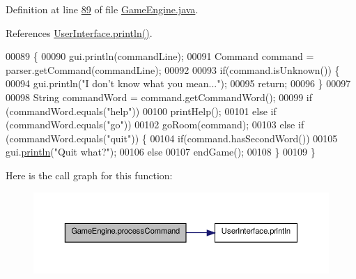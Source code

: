 Definition at line \hyperlink{GameEngine_8java_source_l00089}{89} of file \hyperlink{GameEngine_8java_source}{Game\-Engine.\-java}.



References \hyperlink{UserInterface_8java_source_l00060}{User\-Interface.\-println()}.


\begin{DoxyCode}
00089                                                    \{
00090         gui.println(commandLine);
00091         Command command = parser.getCommand(commandLine);
00092 
00093         \textcolor{keywordflow}{if}(command.isUnknown()) \{
00094             gui.println(\textcolor{stringliteral}{"I don't know what you mean..."});
00095             \textcolor{keywordflow}{return};
00096         \}
00097 
00098         String commandWord = command.getCommandWord();
00099         \textcolor{keywordflow}{if} (commandWord.equals(\textcolor{stringliteral}{"help"}))
00100             printHelp();
00101         \textcolor{keywordflow}{else} \textcolor{keywordflow}{if} (commandWord.equals(\textcolor{stringliteral}{"go"}))
00102             goRoom(command);
00103         \textcolor{keywordflow}{else} \textcolor{keywordflow}{if} (commandWord.equals(\textcolor{stringliteral}{"quit"})) \{
00104             \textcolor{keywordflow}{if}(command.hasSecondWord())
00105                 gui.\hyperlink{classUserInterface_a79f606b4b1f5d1523e50eea00039ed94}{println}(\textcolor{stringliteral}{"Quit what?"});
00106             \textcolor{keywordflow}{else}
00107                 endGame();
00108         \}
00109     \}
\end{DoxyCode}


Here is the call graph for this function\-:\nopagebreak
\begin{figure}[H]
\begin{center}
\leavevmode
\includegraphics[width=350pt]{classGameEngine_ad7133885f313fa99bca3bb7cb8272f64_cgraph}
\end{center}
\end{figure}


